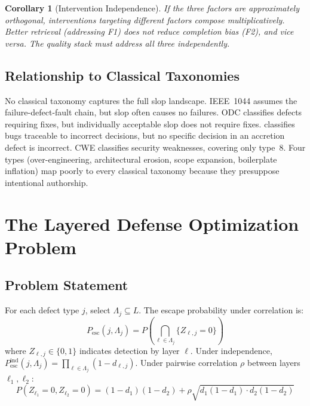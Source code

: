 \documentclass[11pt, a4paper, logo, copyright]{googledeepmind}
\newtheorem{corollary}{Corollary}[section]
\newcommand{\Pesc}{P_{\mathrm{esc}}}
\begin{document}
\begin{corollary}[Intervention Independence]
If the three factors are approximately orthogonal, interventions targeting different factors compose multiplicatively. Better retrieval (addressing F1) does not reduce completion bias (F2), and vice versa. The quality stack must address all three independently.
\end{corollary}

\subsection{Relationship to Classical Taxonomies}

No classical taxonomy captures the full slop landscape. IEEE~1044 \citep{ieee1044} assumes the failure-defect-fault chain, but slop often causes no failures. ODC \citep{chillarege1992} classifies defects requiring fixes, but individually acceptable slop does not require fixes. \citet{beizer1990} classifies bugs traceable to incorrect decisions, but no specific decision in an accretion defect is incorrect. CWE classifies security weaknesses, covering only type~8. Four types (over-engineering, architectural erosion, scope expansion, boilerplate inflation) map poorly to every classical taxonomy because they presuppose intentional authorship.


\section{The Layered Defense Optimization Problem}
\label{sec:optimization}

\subsection{Problem Statement}

For each defect type $j$, select $\Lambda_j \subseteq L$. The escape probability under correlation is:
\begin{equation}
\label{eq:pesc}
\Pesc(j, \Lambda_j) = P\!\left(\bigcap_{\ell \in \Lambda_j} \{Z_{\ell,j} = 0\}\right)
\end{equation}
where $Z_{\ell,j} \in \{0,1\}$ indicates detection by layer $\ell$. Under independence, $\Pesc^{\mathrm{ind}}(j, \Lambda_j) = \prod_{\ell \in \Lambda_j} (1 - d_{\ell,j})$. Under pairwise correlation $\rho$ between layers $\ell_1, \ell_2$:
\begin{equation}
P(Z_{\ell_1} = 0, Z_{\ell_2} = 0) = (1-d_1)(1-d_2) + \rho\sqrt{d_1(1-d_1) \cdot d_2(1-d_2)}
\end{equation}
\end{document}
